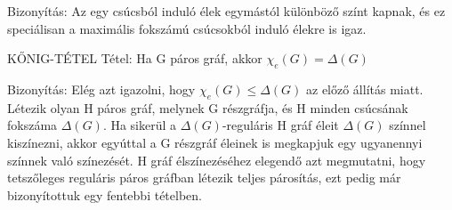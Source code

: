 \documentclass[]{article}
\begin{document}
\begin{leftbar}
Bizonyítás: Az egy csúcsból induló élek egymástól különböző színt kapnak, és ez speciálisan a maximális fokszámú csúcsokból induló élekre is igaz.
\end{leftbar}
\begin{framed}
KŐNIG-TÉTEL Tétel: Ha G páros gráf, akkor $\chi_e(G) = \Delta(G)$
\end{framed}
\begin{leftbar}
Bizonyítás: Elég azt igazolni, hogy $\chi_e(G) \leq \Delta(G)$ az előző állítás miatt. Létezik olyan H páros gráf, melynek G részgráfja, és H minden csúcsának fokszáma $\Delta(G)$. Ha sikerül a $\Delta(G)$-reguláris H gráf éleit $\Delta(G)$ színnel kiszínezni, akkor egyúttal a G részgráf éleinek is megkapjuk egy ugyanennyi színnek való színezését. H gráf élszínezéséhez elegendő azt megmutatni, hogy tetszőleges reguláris páros gráfban létezik teljes párosítás, ezt pedig már bizonyítottuk egy fentebbi tételben. 
\end{leftbar}
\end{document}
